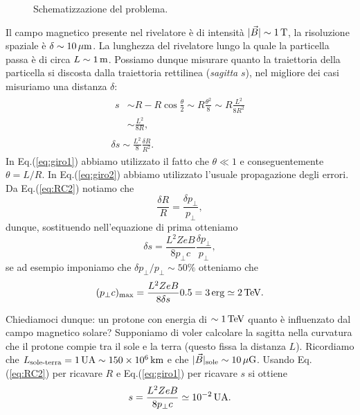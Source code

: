 \begin{figure}[H]
    \centering
    \caption{Schematizzazione del problema.}
    \label{img:giroradius}
\end{figure}

Il campo magnetico presente nel rivelatore è di intensità $| \vec{B}| \sim 1\,\textup{T}$, la risoluzione spaziale è $\delta \sim 10 \,\mu\textup{m}$. La lunghezza del rivelatore lungo la quale la particella passa è di circa $L \sim 1\,\textup{m}$. Possiamo dunque misurare quanto la traiettoria della particella si discosta dalla  traiettoria rettilinea (\emph{sagitta} $s$), nel migliore dei casi misuriamo una distanza $\delta$:
\begin{gather}
    \begin{split}
        s & \sim R - R\cos \frac{\theta}{2} \sim R\frac{\theta^2}{8} \sim R \frac{L^2}{8 R^2}\\
               & \sim \frac{L^2}{8 R},\label{eq:giro1}
    \end{split}\\
    \delta s \sim \frac{L^2}{8}\frac{\delta R}{R^2}.\label{eq:giro2}
\end{gather}
In Eq.(\ref{eq:giro1}) abbiamo utilizzato il fatto che $\theta \ll 1$ e conseguentemente $\theta = L/R$. In Eq.(\ref{eq:giro2}) abbiamo utilizzato l'usuale propagazione degli errori. Da Eq.(\ref{eq:RC2}) notiamo che
\begin{equation*}
    \frac{\delta R}{R} = \frac{\delta p_\bot}{p_\bot},
\end{equation*}
dunque, sostituendo nell'equazione di prima otteniamo
\begin{equation*}
    \delta s = \frac{L^2 ZeB}{8p_\bot c} \frac{\delta p_\bot}{p_\bot},
\end{equation*}
se ad esempio imponiamo che $\delta p_\bot / p_\bot \sim 50\%$ otteniamo che
\begin{equation*}
    (p_\bot c)_\textup{max} = \frac{L^2 ZeB}{8\delta s} 0.5 = 3\,\textup{erg} \simeq 2\,\textup{TeV}. 
\end{equation*}
\begin{example}
    Chiediamoci dunque: un protone con energia di $\sim1\,\textup{TeV}$ quanto è influenzato dal campo magnetico solare? Supponiamo di voler calcolare la sagitta nella curvatura che il protone compie tra il sole e la terra (questo fissa la distanza $L$). Ricordiamo che $L_\textup{sole-terra} = 1\,\textup{UA} \sim 150\times 10^6\,\textup{km}$ e che $|\vec{B}|_\textup{sole} \sim 10\,\mu\textup{G}$. Usando Eq.(\ref{eq:RC2}) per ricavare $R$ e Eq.(\ref{eq:giro1}) per ricavare $s$ si ottiene
    \begin{equation*}
        s = \frac{L^2 ZeB}{8p_\bot c} \simeq 10^{-2}\,\textup{UA}.
    \end{equation*}
\end{example}
